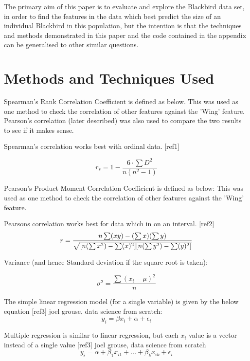 \documentclass{article}
\begin{document}
The primary aim of this paper is to evaluate and explore the Blackbird data set, in order to find the features in the data which best predict the size of an individual Blackbird in this population, but the intention is that the techniques and methods demonstrated in this paper and the code contained in the appendix can be generalised to other similar questions.  
\section{Methods and Techniques Used}
Spearman's Rank Correlation Coefficient is defined as below. This was used as one method to check the correlation of other features against the 'Wing' feature. Pearson's correlation (later described) was also used to compare the two results to see if it makes sense.

Spearman's correlation works best with ordinal data. [ref1]

\begin{equation}
r_s = 1 - \frac{6\cdot \sum D^2}{n(n^2 - 1)}
\end{equation}

Pearson's Product-Moment Correlation Coefficient is defined as below:
This was used as one method to check the correlation of other features against the 'Wing' feature.

Pearsons correlation works best for data which in on an interval. [ref2]
\begin{equation}
r = \frac{ n\sum(xy)- (\sum x)(\sum y) }{%
        \sqrt{[n( \sum x^2) -\sum(x)^2][n (\sum y^2) -\sum(y)^2]}}
\end{equation}

Variance (and hence Standard deviation if the square root is taken):

\begin{equation}
    \sigma^2 = \frac{\displaystyle\sum(x_i - \mu)^2} {n}
\end{equation}

The simple linear regression model (for a single variable)
is given by the below equation [ref3] joel grouse, data science from scratch:
\begin{equation}
    y_i = \beta x_i + \alpha + \epsilon_i
\end{equation}

Multiple regression is similar to linear regression,
but each $x_i$ value is a vector instead of a single value
[ref3] joel grouse, data science from scratch
\begin{equation}
    y_i = \alpha + \beta_1 x_{i1} + ... + \beta_k x_{ik} + \epsilon_i
\end{equation}
\end{document}
